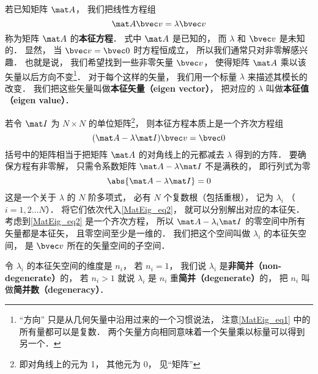 

若已知矩阵 $\mat A$， 我们把线性方程组
\begin{equation}\label{MatEig_eq1}
\mat A \bvec v = \lambda \bvec v
\end{equation}
称为矩阵 $\mat A$ 的\textbf{本征方程}． 式中 $\mat A$ 是已知的， 而 $\lambda$ 和 $\bvec v$ 是未知的． 显然， 当 $\bvec v = \bvec 0$ 时方程恒成立， 所以我们通常只对非零解感兴趣． 也就是说， 我们希望找到一些非零矢量 $\bvec v$， 使得矩阵 $\mat A$ 乘以该矢量以后方向不变\footnote{“方向” 只是从几何矢量中沿用过来的一个习惯说法， 注意\autoref{MatEig_eq1} 中的所有量都可以是复数． 两个矢量方向相同意味着一个矢量乘以标量可以得到另一个．}． 对于每个这样的矢量， 我们用一个标量 $\lambda$ 来描述其模长的改变． 我们把这些矢量叫做\textbf{本征矢量（eigen vector）}， 把对应的 $\lambda$ 叫做\textbf{本征值（eigen value）}．

若令 $\mat I$ 为 $N\times N$ 的单位矩阵\footnote{即对角线上的元为 1， 其他元为 0， 见“矩阵”}， 则本征方程本质上是一个齐次方程组
\begin{equation}\label{MatEig_eq2}
(\mat A - \lambda\mat I)\bvec v = \bvec 0
\end{equation}
括号中的矩阵相当于把矩阵 $\mat A$ 的对角线上的元都减去 $\lambda$ 得到的方阵． 要确保方程有非零解， 只需令系数矩阵 $\mat A - \lambda\mat I$ 不是满秩的， 即行列式为零
\begin{equation}
\abs{\mat A - \lambda\mat I} = 0
\end{equation}
这是一个关于 $\lambda$ 的 $N$ 阶多项式， 必有 $N$ 个复数根（包括重根），%
记为 $\lambda_i$ （$i = 1, 2\dots N$）． 将它们依次代入\autoref{MatEig_eq2}， 就可以分别解出对应的本征矢． 考虑到\autoref{MatEig_eq2} 是一个齐次方程， 所以 $\mat A - \lambda_i\mat I$ 的零空间中所有矢量都是本征矢， 且零空间至少是一维的． 我们把这个空间叫做 $\lambda_i$ 的本征矢空间， 是 $\bvec v$ 所在的矢量空间的子空间．

令 $\lambda_i$ 的本征矢空间的维度是 $n_i$， 若 $n_i = 1$， 我们说 $\lambda_i$ 是\textbf{非简并（non-degenerate）}的， 若 $n_i > 1$ 就说 $\lambda_i$ 是 $n_i$ 重\textbf{简并（degenerate）}的， 把 $n_i$ 叫做\textbf{简并数（degeneracy）}．

